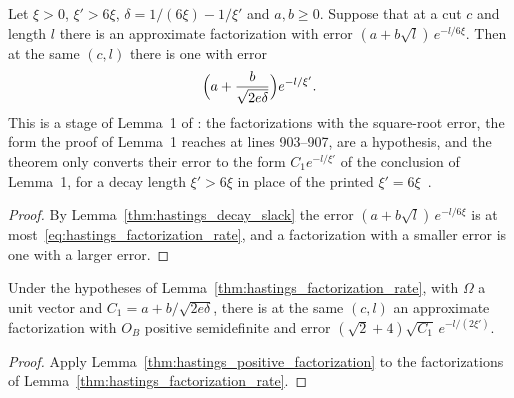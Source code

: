 \begin{lemma}
    \label{thm:hastings_factorization_rate}
    \leanok
    Let $\xi>0$, $\xi'>6\xi$, $\delta=1/(6\xi)-1/\xi'$ and $a,b\ge0$. Suppose
    that at a cut $c$ and length $l$ there is an approximate factorization
    with error $(a+b\sqrt l)\,e^{-l/6\xi}$. Then at the same $(c,l)$ there is
    one with error
    \begin{align}
        \Bigl(a+\frac{b}{\sqrt{2e\delta}}\Bigr)e^{-l/\xi'}.
        \label{eq:hastings_factorization_rate}
    \end{align}
    This is a stage of Lemma~1 of \cite{Hastings2007AreaLaw}: the
    factorizations with the square-root error, the form the proof of Lemma~1
    reaches at lines 903--907, are a hypothesis, and the theorem only converts
    their error to the form $C_1e^{-l/\xi'}$ of the conclusion of Lemma~1, for
    a decay length $\xi'>6\xi$ in place of the printed
    $\xi'=6\xi$~\cite{gap:hastings07_gaussian_average_exponent}.
\end{lemma}
\begin{proof}\leanok
    By Lemma~\ref{thm:hastings_decay_slack} the error
    $(a+b\sqrt l)\,e^{-l/6\xi}$ is at most~\eqref{eq:hastings_factorization_rate},
    and a factorization with a smaller error is one with a larger error.
\end{proof}

\begin{lemma}
    \label{thm:hastings_positive_factorization_rate}
    \leanok
    Under the hypotheses of Lemma~\ref{thm:hastings_factorization_rate},
    with $\Omega$ a unit vector and $C_1=a+b/\sqrt{2e\delta}$, there is at the
    same $(c,l)$ an approximate factorization with $O_B$ positive
    semidefinite and error $(\sqrt2+4)\sqrt{C_1}\,e^{-l/(2\xi')}$.
\end{lemma}
\begin{proof}\leanok
    Apply Lemma~\ref{thm:hastings_positive_factorization} to the
    factorizations of Lemma~\ref{thm:hastings_factorization_rate}.
\end{proof}
